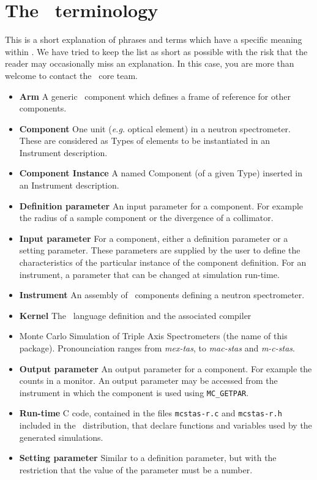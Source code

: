 
\chapter{The \MCX\ terminology}
\label{s:terminology}

This is a short explanation of phrases and terms which have a specific
meaning within \MCX. We have tried to keep the list as short
as possible with the risk that the reader may occasionally miss
an explanation. In this case, you are more than welcome to contact
the \MCX\ core team.

\noindent
\begin{itemize}
\item{\bf Arm}  A generic \MCX\ component which defines a frame of reference
      for other components.
\item{\bf Component} One unit ({\em e.g.} optical element) in a neutron
      spectrometer. These are considered as Types of elements to be instantiated in an Instrument description.
\item{\bf Component Instance} A named Component (of a given Type) inserted in an Instrument description.
\item{\bf Definition parameter} An input parameter for a component. For
  example the radius of a sample component or the divergence of a collimator.
\item{\bf Input parameter} For a component, either a definition parameter
or a setting parameter. These parameters are supplied by the user to
define the characteristics of the particular instance of the component
definition. For an instrument, a parameter that can be changed at
simulation run-time.
\item{\bf Instrument} An assembly of \MCX\ components defining
      a neutron spectrometer.
\item{\bf Kernel} The \MCX\ language definition and the associated compiler
\item{\bf \MCX} Monte Carlo Simulation of Triple Axis Spectrometers
       (the name of this package). Pronounciation ranges from \emph{mex-tas}, to \emph{mac-stas} and \emph{m-c-stas}.
\item{\bf Output parameter} An output parameter for a component.
  For example the counts in a monitor. An output parameter may be
  accessed from the instrument in which the component is used using
  \verb`MC_GETPAR`.
\item{\bf Run-time} C code, contained in the files
  \verb+mcstas-r.c+ and \verb+mcstas-r.h+ included in the \MCX\
  distribution, that declare functions and variables used by the
  generated simulations.
\item{\bf Setting parameter} Similar to a definition parameter, but with the
  restriction that the value of the parameter must be a number.
\end{itemize}
